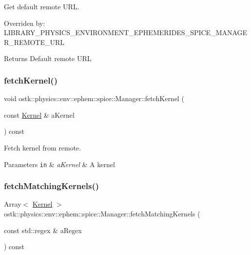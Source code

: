 Get default remote U\+RL. 

Overriden by\+: L\+I\+B\+R\+A\+R\+Y\+\_\+\+P\+H\+Y\+S\+I\+C\+S\+\_\+\+E\+N\+V\+I\+R\+O\+N\+M\+E\+N\+T\+\_\+\+E\+P\+H\+E\+M\+E\+R\+I\+D\+E\+S\+\_\+\+S\+P\+I\+C\+E\+\_\+\+M\+A\+N\+A\+G\+E\+R\+\_\+\+R\+E\+M\+O\+T\+E\+\_\+\+U\+RL

\begin{DoxyReturn}{Returns}
Default remote U\+RL 
\end{DoxyReturn}
\mbox{\label{classostk_1_1physics_1_1env_1_1ephem_1_1spice_1_1_manager_a7c32b7266846a0c0d0471bff27d7ce21}} 
\subsubsection{\texorpdfstring{fetch\+Kernel()}{fetchKernel()}}
{\footnotesize\ttfamily void ostk\+::physics\+::env\+::ephem\+::spice\+::\+Manager\+::fetch\+Kernel (\begin{DoxyParamCaption}\item[{const \hyperlink{classostk_1_1physics_1_1env_1_1ephem_1_1spice_1_1_kernel}{Kernel} \&}]{a\+Kernel }\end{DoxyParamCaption}) const}



Fetch kernel from remote. 


\begin{DoxyParams}[1]{Parameters}
\mbox{\tt in}  & {\em a\+Kernel} & A kernel \\
\hline
\end{DoxyParams}
\mbox{\label{classostk_1_1physics_1_1env_1_1ephem_1_1spice_1_1_manager_a5a539eb56558f1a0d6dfe1389760459f}} 
\subsubsection{\texorpdfstring{fetch\+Matching\+Kernels()}{fetchMatchingKernels()}}
{\footnotesize\ttfamily Array$<$ \hyperlink{classostk_1_1physics_1_1env_1_1ephem_1_1spice_1_1_kernel}{Kernel} $>$ ostk\+::physics\+::env\+::ephem\+::spice\+::\+Manager\+::fetch\+Matching\+Kernels (\begin{DoxyParamCaption}\item[{const std\+::regex \&}]{a\+Regex }\end{DoxyParamCaption}) const}



